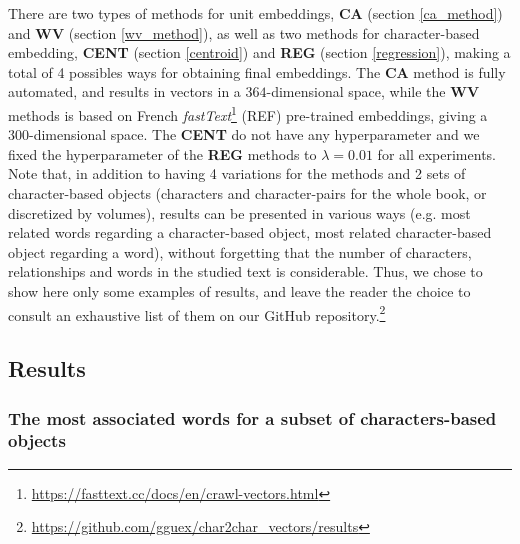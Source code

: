 \documentclass[
twocolumn,
]{ceurart}
\begin{document}
There are two types of methods for unit embeddings, \textbf{CA} (section \ref{ca_method}) and \textbf{WV} (section \ref{wv_method}), as well as two methods for character-based embedding, \textbf{CENT} (section \ref{centroid}) and \textbf{REG} (section \ref{regression}), making a total of 4 possibles ways for obtaining final embeddings. The \textbf{CA} method is fully automated, and results in vectors in a $364$-dimensional space, while the $\textbf{WV}$ methods is based on French \emph{fastText}\footnote{\url{https://fasttext.cc/docs/en/crawl-vectors.html}} (REF) pre-trained embeddings, giving a $300$-dimensional space. The \textbf{CENT} do not have any hyperparameter and we fixed the hyperparameter of the \textbf{REG} methods to $\lambda = 0.01$ for all experiments. \\
Note that, in addition to having 4 variations for the methods and 2 sets of character-based objects (characters and character-pairs for the whole book, or discretized by volumes), results can be presented in various ways (e.g. most related words regarding a character-based object, most related character-based object regarding a word), without forgetting that the number of characters, relationships and words in the studied text is considerable. Thus, we chose to show here only some examples of results, and leave the reader the choice to consult an exhaustive list of them on our GitHub repository.\footnote{\url{https://github.com/gguex/char2char_vectors/results}}

\subsection{Results}

\subsubsection{The most associated words for a subset of characters-based objects}

\end{document}
